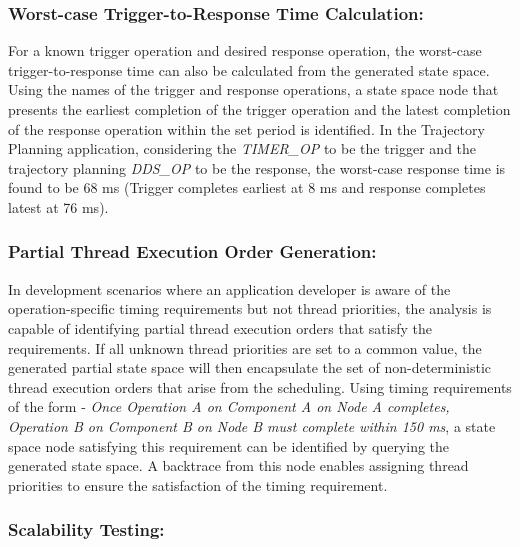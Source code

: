 \vspace{-0.1in}

\subsubsection{Worst-case Trigger-to-Response Time Calculation:}

For a known trigger operation and desired response operation, the worst-case trigger-to-response time can also be calculated from the generated state space. Using the names of the trigger and response operations, a state space node that presents the earliest completion of the trigger operation and the latest completion of the response operation within the set period is identified. In the Trajectory Planning application, considering the \emph{TIMER\_OP} to be the trigger and the trajectory planning \emph{DDS\_OP} to be the response, the worst-case response time is found to be 68 ms (Trigger completes earliest at 8 ms and response completes latest at 76 ms). 

\vspace{-0.1in}

\subsubsection{Partial Thread Execution Order Generation:}

In development scenarios where an application developer is aware of the operation-specific timing requirements but not thread priorities, the analysis is capable of identifying partial thread execution orders that satisfy the requirements. If all unknown thread priorities are set to a common value, the generated partial state space will then encapsulate the set of non-deterministic thread execution orders that arise from the scheduling. Using timing requirements of the form - \emph{Once Operation A on Component A on Node A completes, Operation B on Component B on Node B must complete within 150 ms}, a state space node satisfying this requirement can be identified by querying the generated state space. A backtrace from this node enables assigning thread priorities to ensure the satisfaction of the timing requirement.

\vspace{-0.15in}
\subsubsection{Scalability Testing:}
\label{sec:Scalability_Testing}

